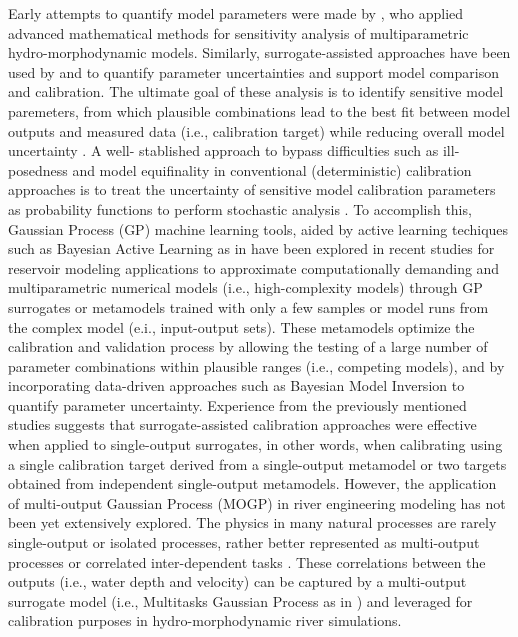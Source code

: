 \documentclass[draft,linenumbers,onecolumn]{agujournal2019} %
\begin{document}
Early attempts to quantify model parameters were made by , who applied advanced mathematical methods for sensitivity analysis of multiparametric hydro-morphodynamic models. Similarly, surrogate-assisted approaches have been used by   and  to quantify parameter uncertainties and support model comparison and calibration. The ultimate goal of these analysis is to identify sensitive model paremeters, from which plausible combinations lead to the best fit between model outputs and measured data (i.e., calibration target) while reducing overall model uncertainty \cite{oberkampf2004verification}. A well- stablished approach to bypass difficulties such as ill-posedness and model equifinality in conventional (deterministic) calibration approaches is to treat the uncertainty of sensitive model calibration parameters as probability functions to perform stochastic analysis \cite{kim2016stepwise}. To accomplish this, Gaussian Process (GP) machine learning tools, aided by active learning techiques such as Bayesian Active Learning as in   have been explored in recent studies for reservoir modeling applications \cite{schwindt2023bayesian, mouris2023stability} to approximate computationally demanding and multiparametric numerical models (i.e., high-complexity models) through GP surrogates or metamodels trained with only a few samples or model runs from the complex model (e.i., input-output sets). These metamodels optimize the calibration and validation process by allowing the testing of a large number of parameter combinations within plausible ranges (i.e., competing models), and by incorporating data-driven approaches such as Bayesian Model Inversion \cite{mohammadi2018bayesian} to quantify parameter uncertainty. Experience from the previously mentioned studies suggests that surrogate-assisted calibration approaches were effective when applied to single-output surrogates, in other words, when calibrating using a single calibration target derived from a single-output metamodel or two targets obtained from independent single-output metamodels.  However, the application of multi-output Gaussian Process (MOGP) in river engineering modeling has not been yet extensively explored. The physics in many natural processes are rarely single-output or isolated processes, rather better represented as multi-output processes \cite{ferreira2022multioutput} or correlated inter-dependent tasks \cite{bonilla2007multitask}. These correlations between the outputs (i.e., water depth and velocity) can be captured by a multi-output surrogate model (i.e., Multitasks Gaussian Process as in \cite{bonilla2007multitask}) and leveraged for calibration purposes in hydro-morphodynamic river simulations. 
\end{document}

